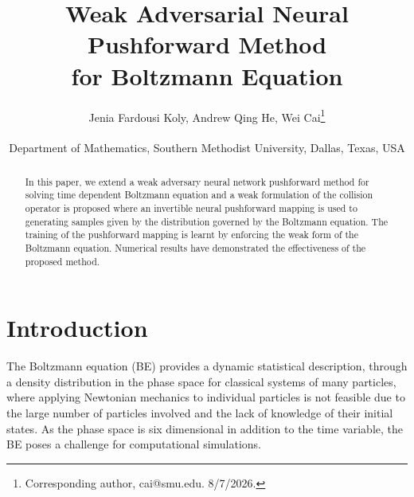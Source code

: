 \documentclass[11pt]{article}
\title{\textbf{Weak Adversarial Neural Pushforward Method \\ for Boltzmann Equation}}
\author{Jenia Fardousi Koly, Andrew Qing He, Wei Cai\thanks{Corresponding author, cai@smu.edu. 8/7/2026.} \\ \\ Department of Mathematics, Southern Methodist University, Dallas, Texas, USA}
\date{}
\theoremstyle{plain}
\begin{document}
\maketitle



\begin{abstract}
    In this paper, we extend a weak adversary neural network pushforward method for solving time dependent Boltzmann equation and a weak formulation of the collision operator is proposed where an invertible neural pushforward mapping is used to generating samples given by the distribution governed by the Boltzmann equation. The training of the pushforward mapping is learnt by enforcing the weak form of the Boltzmann equation. Numerical results have demonstrated the effectiveness of the proposed method.  
\end{abstract}






\section{Introduction}

The Boltzmann equation (BE) provides a dynamic statistical description, through a density distribution in the phase space for classical systems of many particles, where applying Newtonian mechanics to individual particles is not feasible due to the large number of particles involved and the lack of knowledge of their initial states. As the phase space is six dimensional in addition to the time variable, the BE poses a challenge for computational simulations.
\end{document}
